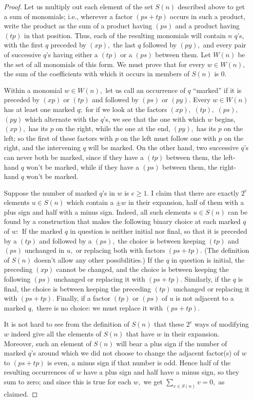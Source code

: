 \documentclass{amsart}
\begin{document}
\begin{proof}
Let us multiply out each element of the set $S(n)$ described
above to get a sum of monomials;
i.e., wherever a factor $(ps+tp)$ occurs in such a product, write the
product as the sum of a product having $(ps)$ and
a product having $(tp)$ in that position.
Thus, each of the resulting monomials will contain
$n$ $\!q\!$'s, with the first $q$ preceded by $(xp),$ the last $q$
followed by $(py),$ and every pair of successive $\!q\!$'s having
either a $(tp)$ or a $(ps)$ between them.
Let $W(n)$ be the set of all monomials of this form.
We must prove that for every $w\in W(n),$ the sum of the
coefficients with which it occurs in members of $S(n)$ is $0.$

Within a monomial $w\in W(n),$ let us call an
occurrence of $q$ ``marked''
if it is preceded by $(xp)$ or $(tp)$ and followed by $(ps)$ or $(py).$
Every $w\in W(n)$ has at least one marked $q;$ for if we look
at the factors $(xp),$ $(tp),$ $(ps),$ $(py)$ which alternate
with the $\!q\!$'s, we see that the one with which $w$
begins, $(xp),$ has its $p$ on the right, while the one at the end,
$(py),$ has its $p$ on the left; so the first of these factors with
$p$ on the left must follow one with
$p$ on the right, and the intervening $q$ will be marked.
On the other hand, two successive $\!q\!$'s can never both be marked,
since if they have a $(tp)$ between them, the left-hand $q$ won't
be marked, while if they have a $(ps)$ between them, the right-hand $q$
won't be marked.

Suppose the number of marked $\!q\!$'s in $w$ is $e\geq 1.$
I claim that there are exactly $2^e$ elements $u\in S(n)$ which contain
a $\pm w$ in their expansion, half of them with a plus sign
and half with a minus sign.
Indeed, all such elements
$u\in S(n)$ can be found by a construction that makes
the following binary choice at each marked $q$ of $w:$
If the marked $q$ in question is neither initial nor final, so that
it is preceded by a $(tp)$ and followed by a $(ps),$ the choice
is between keeping $(tp)$ and $(ps)$ unchanged in $u,$
or replacing both with factors $(ps+tp).$
(The definition of $S(n)$ doesn't allow any other possibilities.)
If the $q$ in question is initial, the preceding
$(xp)$ cannot be changed, and the choice is between
keeping the following $(ps)$ unchanged or replacing it with $(ps+tp).$
Similarly, if the $q$ is final, the choice is between
keeping the preceding $(tp)$ unchanged or replacing it with $(ps+tp).$
Finally, if a factor $(tp)$ or $(ps)$ of $u$ is not
adjacent to a marked $q,$ there is no choice:
we must replace it with $(ps+tp).$

It is not hard to see from the definition of $S(n)$
that these $2^e$ ways of modifying $w$ indeed give all
the elements of $S(n)$ that have $w$ in their expansion.
Moreover, such an element of  $S(n)$ will bear a plus sign if the
number of marked $\!q\!$'s around which we did not choose to change
the adjacent factor(s) of $w$ to $(ps+tp)$
is even, a minus sign if that number is odd.
Hence half of the resulting occurrences
of $w$ have a plus sign and half have a minus
sign, so they sum to zero; and since this is true for each $w,$ we
get $\sum_{v\in S(n)} v =0,$ as claimed.
\end{proof}
\end{document}
